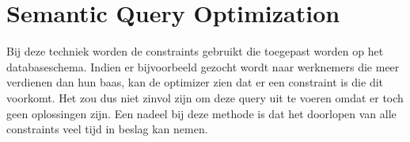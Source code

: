 \section{Semantic Query Optimization}
Bij deze techniek worden de constraints gebruikt die toegepast worden op het databaseschema. Indien er bijvoorbeeld gezocht wordt naar werknemers die meer verdienen dan hun baas, kan de optimizer zien dat er een constraint is die dit voorkomt. Het zou dus niet zinvol zijn om deze query uit te voeren omdat er toch geen oplossingen zijn. Een nadeel bij deze methode is dat het doorlopen van alle constraints veel tijd in beslag kan nemen.